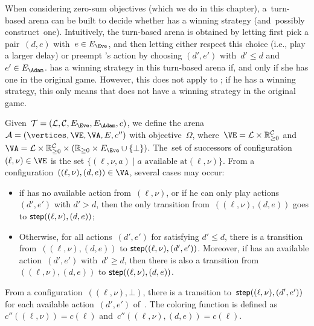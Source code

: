 \begin{remark}
  When considering zero-sum objectives (which we do in this chapter),
a~turn-based arena can be built to decide whether \Eve has a winning
strategy (and~possibly construct~one).  Intuitively, the turn-based
arena is obtained by letting \Eve first pick a pair~$(d,e)$ with~$e
\in \EE$, and then letting \Adam either respect this choice (i.e.,
play a larger delay) or preempt \Eve's action by choosing $(d',e')$
with~$d' \leq d$ and~$e' \in \EA$.
\Eve has a winning strategy in this turn-based arena if, and only if she has one in the original game.
However, this does not apply to \Adam; if he has a winning strategy, this only means that \Eve
does not have a winning strategy in the original game.

Given~$\calT = (\Locs, \Clocks,\EE,\EA, c)$, we define the arena~$\TA
= (\vertices,\VE,\VA,E, c'')$ 
with objective~$\Omega$, where~$\VE = \Locs\times \Realnn^\Clocks$ and
$\VA=\Locs\times\Realnn^\Clocks\times(\Realnn \times \EE
\cup\{\bot\})$.  The~set of successors of configuration~$(\ell,\nu)
\in \VE$ is the set $\{(\ell,\nu,a)\mid a \text{ available at
}(\ell,\nu)\}$.
From a configuration~$((\ell,\nu),(d,e))\in\VA$, several cases may
occur:
\begin{itemize}
\item if \Adam has no available action from~$(\ell,\nu)$, or if he can
  only play actions~$(d',e')$ with $d'>d$, then the only transition
  from~$((\ell,\nu),(d,e))$ goes to $\mathsf{step}((\ell,\nu),(d,e))$;
\item Otherwise, for all actions~$(d',e')$ for \Adam satisfying $d'\leq d$,
  there is a transition from~$((\ell,\nu),(d,e))$
  to $\mathsf{step}((\ell,\nu),(d',e'))$.
  Moreover, if \Adam has an available action~$(d',e')$ with~$d'\geq d$,
  then there is also a transition
  from~$((\ell,\nu),(d,e))$ to $\mathsf{step}((\ell,\nu),(d,e))$.
\end{itemize}
From a configuration~$((\ell,\nu),\bot)$, there is a transition
to~$\mathsf{step}((\ell,\nu),(d',e'))$ for each available action~$(d',e')$
of~\Adam.
The coloring function is defined as~$c''((\ell,\nu)) = c(\ell)$
and~$c''((\ell,\nu),(d,e)) = c(\ell)$.


\end{remark}



